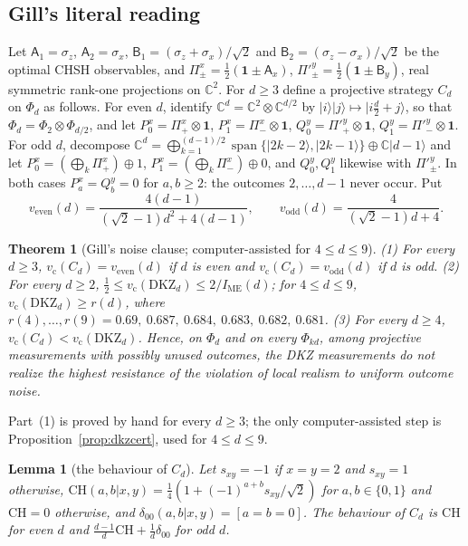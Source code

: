 \documentclass[11pt]{article}
\newtheorem{theorem}{Theorem}
\newtheorem{lemma}{Lemma}[section]
\theoremstyle{remark}
\numberwithin{equation}{section}
\newcommand{\C}{\mathbb{C}}
\newcommand{\IME}{I_{\mathrm{ME}}}
\newcommand{\one}{\mathbf{1}}
\newcommand{\vc}{v_{\mathrm c}}
\newcommand{\veven}{v_{\mathrm{even}}}
\newcommand{\vodd}{v_{\mathrm{odd}}}
\newcommand{\CH}{\mathrm{CH}}
\newcommand{\DKZ}{\mathrm{DKZ}}
\newcommand{\sA}{\mathsf{A}}
\newcommand{\sB}{\mathsf{B}}
\begin{document}
\subsection{Gill's literal reading}\label{subsec:literal}
Let $\sA_1=\sigma_z$, $\sA_2=\sigma_x$, $\sB_1=(\sigma_z+\sigma_x)/\sqrt2$ and $\sB_2=(\sigma_z-\sigma_x)/\sqrt2$ be the
optimal CHSH observables, and $\Pi^x_\pm=\frac12(\one\pm\sA_x)$, $\Pi'^y_\pm=\frac12(\one\pm\sB_y)$, real symmetric
rank-one projections on $\C^2$. For $d\ge3$ define a projective strategy $C_d$ on $\Phi_d$ as follows. For even $d$,
identify $\C^d=\C^2\otimes\C^{d/2}$ by $|i\rangle|j\rangle\mapsto|i\frac d2+j\rangle$, so that $\Phi_d=\Phi_2\otimes\Phi_{d/2}$,
and let $P^x_0=\Pi^x_+\otimes\one$, $P^x_1=\Pi^x_-\otimes\one$, $Q^y_0=\Pi'^y_+\otimes\one$, $Q^y_1=\Pi'^y_-\otimes\one$.
For odd $d$, decompose $\C^d=\bigoplus_{k=1}^{(d-1)/2}\operatorname{span}\{|2k-2\rangle,|2k-1\rangle\}\oplus\C|d-1\rangle$
and let $P^x_0=(\bigoplus_k\Pi^x_+)\oplus1$, $P^x_1=(\bigoplus_k\Pi^x_-)\oplus0$, and $Q^y_0,Q^y_1$ likewise with
$\Pi'^y_\pm$. In both cases $P^x_a=Q^y_b=0$ for $a,b\ge2$: the outcomes $2,\dots,d-1$ never occur. Put
\begin{equation}\label{eq:vevenodd}
\veven(d)=\frac{4(d-1)}{(\sqrt2-1)d^2+4(d-1)},\qquad\vodd(d)=\frac4{(\sqrt2-1)d+4}.
\end{equation}

\begin{theorem}[Gill's noise clause; computer-assisted for $4\le d\le9$]\label{thm:literal}
\textup{(1)} For every $d\ge3$, $\vc(C_d)=\veven(d)$ if $d$ is even and $\vc(C_d)=\vodd(d)$ if $d$ is odd.
\textup{(2)} For every $d\ge2$, $\frac12\le\vc(\DKZ_d)\le2/\IME(d)$; for $4\le d\le9$, $\vc(\DKZ_d)\ge r(d)$, where
$r(4),\dots,r(9)=0.69,\ 0.687,\ 0.684,\ 0.683,\ 0.682,\ 0.681$.
\textup{(3)} For every $d\ge4$, $\vc(C_d)<\vc(\DKZ_d)$. Hence, on $\Phi_d$ and on every $\Phi_{kd}$, among projective
measurements with possibly unused outcomes, the DKZ measurements do not realize the highest resistance of the violation
of local realism to uniform outcome noise.
\end{theorem}

Part~(1) is proved by hand for every $d\ge3$; the only computer-assisted step is Proposition~\ref{prop:dkzcert}, used for
$4\le d\le9$.

\begin{lemma}[the behaviour of $C_d$]\label{lem:Cbeh}
Let $s_{xy}=-1$ if $x=y=2$ and $s_{xy}=1$ otherwise, $\CH(a,b|x,y)=\frac14(1+(-1)^{a+b}s_{xy}/\sqrt2)$ for $a,b\in\{0,1\}$
and $\CH=0$ otherwise, and $\delta_{00}(a,b|x,y)=[a=b=0]$. The behaviour of $C_d$ is $\CH$ for even $d$ and
$\frac{d-1}d\CH+\frac1d\delta_{00}$ for odd $d$.
\end{lemma}
\end{document}
